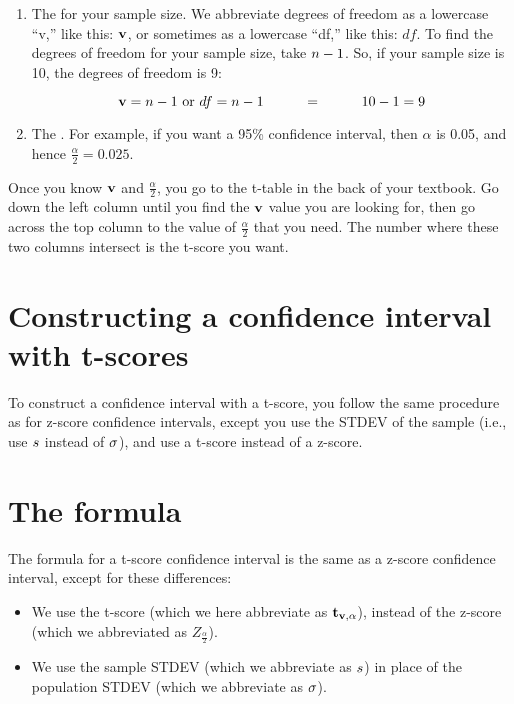 \documentclass[../../../main.tex]{subfiles}
\begin{document}
\begin{enumerate}
  \item The  for your sample size. We abbreviate degrees of freedom as a lowercase ``v,'' like this: $\DegFreedom/$, or sometimes as a lowercase ``df,'' like this: $df$. To find the degrees of freedom for your sample size, take $\samplesize/ - 1$. So, if your sample size is 10, the degrees of freedom is 9: 
  
  \begin{equation*}
    \DegFreedom/ = \samplesize/ - 1 \text{ or }df = \samplesize/ - 1 \hskip 1cm = \hskip 1cm 10 - 1 = 9
  \end{equation*}

  \item The . For example, if you want a 95\% confidence interval, then $\alpha$ is 0.05, and hence $\frac{\alpha}{2} = 0.025$.

\end{enumerate}

\noindent
Once you know $\DegFreedom/$ and $\frac{\alpha}{2}$, you go to the t-table in the back of your textbook. Go down the left column until you find the $\DegFreedom/$ value you are looking for, then go across the top column to the value of $\frac{\alpha}{2}$ that you need. The number where these two columns intersect is the t-score you want.


\section{Constructing a confidence interval with t-scores}

To construct a confidence interval with a t-score, you follow the same procedure as for z-score confidence intervals, except you use the STDEV of the sample (i.e., use $s$ instead of $\sigma$), and use a t-score instead of a z-score.


\section{The formula}

The formula for a t-score confidence interval is the same as a z-score confidence interval, except for these differences:

\begin{itemize}
  \item We use the t-score (which we here abbreviate as $\tscore/$), instead of the z-score (which we abbreviated as $Z_{\frac{\alpha}{2}}$).
  \item We use the sample STDEV (which we abbreviate as $s$) in place of the population STDEV (which we abbreviate as $\sigma$).
\end{itemize}
\end{document}
